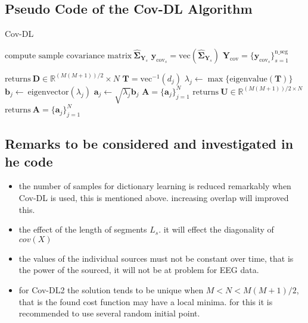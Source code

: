 \subsection{Pseudo Code of the Cov-DL Algorithm}
\begin{algorithm}[H]
\caption{Cov-DL}
\begin{algorithmic}[1]
				\State$\text{compute sample covariance matrix}\ \widehat{\boldsymbol{\Sigma}}_{\textbf{Y}_s} $
				\State$\textbf{y}_{\text{cov}_s} = \text{vec}(\widehat{\boldsymbol{\Sigma}}_{\textbf{Y}_s})$	
			\EndFor			
			\State$\textbf{Y}_{\text{cov}} = \{\textbf{y}_{\text{cov}_s}\}_{s=1}^{\text{n\_seg}}$
			
			\State$\text{returns} \ \textbf{D} \in \mathbb{R}^{(M(M+1))/2}\times N$
			\EndProcedure
			\State$\textbf{T} = \text{vec}^{-1}(d_j)$            
			\State$\lambda_j\gets \max\{\text{eigenvalue}(\textbf{T})\}$
			\State$\textbf{b}_j \gets \ \text{eigenvector}(\lambda_j)$
			\State$\textbf{a}_j \gets \sqrt{\lambda_j}\textbf{b}_j$
			\EndFor
			\State$\textbf{A} = \{\textbf{a}_j\}_{j=1}^N$
			\EndIf
			\State
				\State$\text{returns} \ \textbf{U}\in \mathbb{R}^{(M(M+1))/2\times N}$
				\EndProcedure
				\State$\text{returns}\ \textbf{A}= \{\textbf{a}_j\}_{j=1}^{N}$
				\EndProcedure
			\EndIf
           \EndProcedure
        \end{algorithmic} 
        \label{alg:Cov1}
\end{algorithm}

\subsection{Remarks to be considered and investigated in he code}
\begin{itemize}
\item the number of samples for dictionary learning is reduced remarkably when Cov-DL is used, this is mentioned above. increasing overlap will improved this. 
\item the effect of the length of segments $L_s$. it will effect the diagonality of $cov(X)$
\item the values of the individual sources must not be constant over time, that is the power of the sourced, it will not be at problem for EEG data. 
\item for Cov-DL2 the solution tends to be unique when $M<N<M(M+1)/2$, that is the found cost function may have a local minima. for this it is recommended to use several random initial point.  
\end{itemize}


